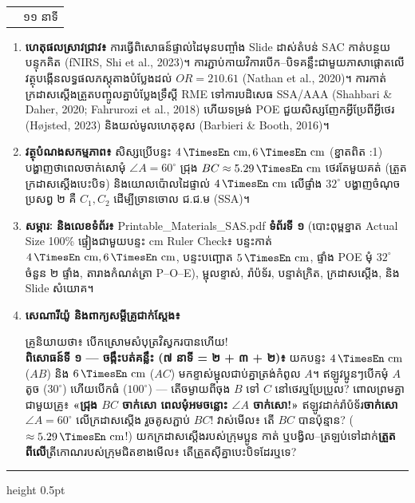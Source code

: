 \documentclass[a4paper,12pt]{article}
\makeatletter
\newcommand{\en}[1]{{\TimesEn #1}}
\newcommand{\enbf}[1]{{\TimesEn\textbf{#1}}}
\newcommand{\unit}[1]{\,\text{\en{#1}}}
\newcommand{\ang}[1]{\ensuremath{\angle #1}}
\newenvironment{phasebox}[3]{%
  \needspace{2.2cm}%
  \begin{tcolorbox}[
    enhanced, sharp corners, colback=headgray, colframe=black,
    boxrule=1.0pt, top=4pt, bottom=4pt, left=9pt, right=9pt,
    before skip=7pt, after skip=3pt
  ]%
    \renewcommand{\arraystretch}{1.0}%
    \begin{tabular*}{\linewidth}{@{}>{\raggedright\arraybackslash}p{13.60cm}@{\extracolsep{\fill}}r@{}}
      {\muol\fontsize{11pt}{17.5pt}\selectfont #1} & {\fontsize{10.5pt}{15pt}\selectfont\en{#2 |} #3}%
    \end{tabular*}%
  \end{tcolorbox}%
  \begingroup\fontsize{11.5pt}{18.2pt}\selectfont
}{%
  \par\endgroup\vspace{3pt}\hrule height 0.5pt\vspace{5pt}%
}
\makeatother
\begin{document}
\begin{phasebox}{ជំហានទី ៣ \enbf{(}ក\enbf{)} \enbf{--- E2 Explore}៖ ពិសោធន៍ទី ១ ចង្កឹះគន្លឹះ \enbf{\&} ពិសោធន៍ទី ២ \enbf{POE} អន្ទាក់ \enbf{SSA}}{11--22 min}{១១ នាទី}
  \begin{enumerate}[leftmargin=0.45cm, topsep=2pt, itemsep=4pt, parsep=0pt]
    \item \textbf{ហេតុផលស្រាវជ្រាវ៖} ការធ្វើពិសោធន៍ផ្ទាល់ដៃមុនបញ្ចាំង \en{Slide} ដាស់តំបន់ \en{SAC} កាត់បន្ថយបន្ទុកគិត (\en{fNIRS}, \en{Shi et al., 2023})។ ការភ្ជាប់កាយវិការបើក--បិទគន្លឹះជាមួយភាសាផ្ដោតលើវត្ថុបង្កើនលទ្ធផលភស្តុតាងបំប្លែងដល់ $OR = 210.61$ \en{(Nathan et al., 2020)}។ ការកាត់ក្រដាសស្តើងត្រួតបញ្ចូលគ្នាបំប្លែងទ្រឹស្ដី \en{RME} ទៅការបដិសេធ \en{SSA/AAA} \en{(Shahbari \& Daher, 2020; Fahrurozi et al., 2018)} ហើយទម្រង់ \en{POE} ជួយសិស្សញែកអ្វីប្រែពីអ្វីថេរ \en{(H\o jsted, 2023)} និងយល់មូលហេតុខុស \en{(Barbieri \& Booth, 2016)}។
    \item \textbf{វត្ថុបំណងសកម្មភាព៖} សិស្សប្រើបន្ទះ $4\unit{cm}, 6\unit{cm}$ (ខ្នាតពិត \en{1:1}) បង្ហាញថាពេលចាក់សោមុំ $\ang{A} = 60^\circ$ ជ្រុង $BC \approx 5.29\unit{cm}$ ថេរតែមួយគត់ (ត្រួតក្រដាសស្តើងបេះបិទ) និងយោលប៉ោលដៃផ្ទាល់ $4\unit{cm}$ លើផ្ទាំង $32^\circ$ បង្ហាញចំណុចប្រសព្វ ២ គឺ $C_1, C_2$ ដើម្បីច្រានចោល ជ.ជ.ម (\en{SSA})។
    \item \textbf{សម្ភារៈ និងលេខទំព័រ៖} \en{Printable\_Materials\_SAS.pdf} \textbf{ទំព័រទី ១} (បោះពុម្ពខ្នាត \en{Actual Size 100\%} ផ្ទៀងជាមួយបន្ទះ \en{5 cm Ruler Check}៖ បន្ទះកាត់ $4\unit{cm}, 6\unit{cm}$, បន្ទះបញ្ឆោត $5\unit{cm}$, ផ្ទាំង \en{POE} មុំ $32^\circ$ ចំនួន ២ ផ្ទាំង, តារាងកំណត់ត្រា \en{P--O--E}), ម្ជុលខ្ទាស់, រ៉ាប៉ទ័រ, បន្ទាត់ក្រិត, ក្រដាសស្តើង, និង \en{Slide} សំយោគ។
    \item \textbf{សេណារីយ៉ូ និងពាក្យសម្ដីគ្រូជាក់ស្ដែង៖}
      \begin{scriptbox}
        {\muol\fontsize{10.8pt}{17pt}\selectfont \enbf{«}គ្រូនិយាយថា៖} បើកស្រោមសំបុត្រវិស្វករបានហើយ!\\
        \textbf{ពិសោធន៍ទី ១ — ចង្កឹះបត់គន្លឹះ (៧ នាទី = ២ + ៣ + ២)៖} យកបន្ទះ $4\unit{cm}$ ($AB$) និង $6\unit{cm}$ ($AC$) មកខ្ទាស់ម្ជុលជាប់គ្នាត្រង់កំពូល $A$។ ឥឡូវប្អូនៗបើកមុំ $A$ តូច ($30^\circ$) ហើយបើកធំ ($100^\circ$) — តើចម្ងាយពីចុង $B$ ទៅ $C$ នៅថេរឬប្រែប្រួល? ពោលព្រមគ្នាជាមួយគ្រូ៖ \textbf{«ជ្រុង $BC$ ចាក់សោ ពេលមុំអមចន្លោះ $\ang{A}$ ចាក់សោ!»} ឥឡូវដាក់រ៉ាប៉ទ័រ\textbf{ចាក់សោ $\ang{A} = 60^\circ$} លើក្រដាសស្តើង រួចគូសភ្ជាប់ $BC$! វាស់មើល៖ តើ $BC$ បានប៉ុន្មាន? ($\approx 5.29\unit{cm}$!) យកក្រដាសស្តើងរបស់ក្រុមប្អូន កាត់ ឬបង្វិល--ត្រឡប់ទៅដាក់\textbf{ត្រួតពីលើ}ត្រីកោណរបស់ក្រុមជិតខាងមើល៖ តើត្រួតស៊ីគ្នាបេះបិទដែរឬទេ?\\

\end{scriptbox}
\end{enumerate}
\end{phasebox}
\end{document}
